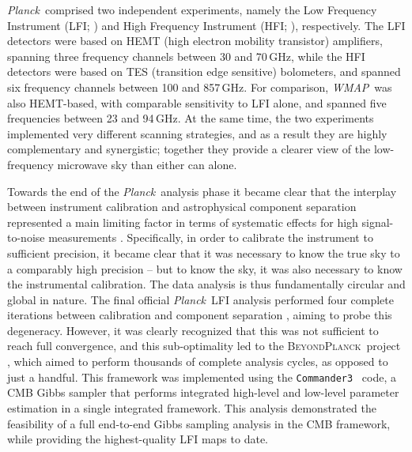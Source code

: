 \documentclass[twocolumn]{../../common/aa}
\def\WMAP{\emph{WMAP}}
\def\COBE{\emph{COBE}}
\def\Planck{\emph{Planck}}
\def\commander{\texttt{Commander}}
\def\commanderthree{\texttt{Commander3}}
\newcommand{\BP}{\textsc{BeyondPlanck}}
\begin{document}
\Planck\ comprised two independent experiments, namely the Low Frequency Instrument (LFI; \citealp{planck2016-l02}) and High Frequency Instrument (HFI; \citealp{planck2016-l03}), respectively. The LFI detectors were based on HEMT (high electron mobility transistor) amplifiers, spanning three frequency channels between 30 and 70\,GHz, while the HFI detectors were based on TES (transition edge sensitive) bolometers, and spanned six frequency channels between 100 and 857\,GHz. For comparison, \WMAP\ was also HEMT-based, with comparable sensitivity to LFI alone, and spanned five frequencies between 23 and 94\,GHz. At the same time, the two experiments implemented very different scanning strategies, and as a result they are highly complementary and synergistic; together they provide a clearer view of the low-frequency microwave sky than either can alone.


Towards the end of the \Planck\ analysis phase it became clear that the interplay between instrument calibration and astrophysical component separation represented a main limiting factor in terms of systematic effects for high signal-to-noise measurements \citep{planck2016-l02}. Specifically, in order to calibrate the instrument to sufficient precision, it became clear that it was necessary to know the true sky to a comparably high precision -- but to know the sky, it was also necessary to know the instrumental calibration. The data analysis is thus fundamentally circular and global in nature. The final official \Planck\ LFI analysis performed four complete iterations between calibration and component separation \citep{planck2016-l02}, aiming to probe this degeneracy. However, it was clearly recognized that this was not sufficient to reach full convergence, and this sub-optimality led to the \BP\ project \citep{bp01}, which aimed to perform thousands of complete analysis cycles, as opposed to just a handful. This framework was implemented using the \commanderthree\ \citep{bp03} code, a CMB Gibbs sampler that performs integrated high-level and low-level parameter estimation in a single integrated framework. This analysis demonstrated the feasibility of a full end-to-end Gibbs sampling analysis in the CMB framework, while providing the highest-quality LFI maps to date.
\end{document}
